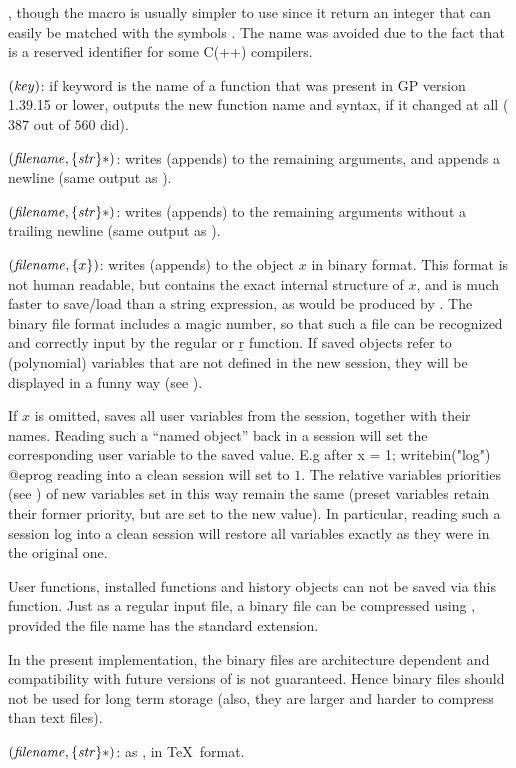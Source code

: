 , though the macro  is usually simpler to use
since it return an integer that can easily be matched with the symbols \typ{*}.
The name  was avoided due to the fact that  is a reserved identifier for some C(++) compilers.

$(\hbox{\it key\/})$: if keyword  is the name
of a function that was present in GP version 1.39.15 or lower, outputs
the new function name and syntax, if it changed at all ($387$ out of $560$
did).\label{se:whatnow}

$(\hbox{\it filename\/},\{\hbox{\it str\/}\}*)$: writes (appends)
to  the remaining arguments, and appends a newline (same output
as ).\label{se:write}

$(\hbox{\it filename\/},\{\hbox{\it str\/}\}*)$: writes (appends) to
 the remaining arguments without a trailing newline
(same output as ).

$(\hbox{\it filename\/},\{x\})$: writes (appends) to
 the object $x$ in binary format. This format is not human
readable, but contains the exact internal structure of $x$, and is much
faster to save/load than a string expression, as would be produced by
. The binary file format includes a magic number, so that such a
file can be recognized and correctly input by the regular  or \b{r}
function. If saved objects refer to (polynomial) variables that are not
defined in the new session, they will be displayed in a funny way (see
).

If $x$ is omitted, saves all user variables from the session, together with
their names. Reading such a ``named object'' back in a  session will set
the corresponding user variable to the saved value. E.g after
\bprog
x = 1; writebin("log")
@eprog\noindent
reading  into a clean session will set  to $1$.
The relative variables priorities (see ) of new variables
set in this way remain the same (preset variables retain their former
priority, but are set to the new value). In particular, reading such a
session log into a clean session will restore all variables exactly as they
were in the original one.

User functions, installed functions and history objects can not be saved via
this function. Just as a regular input file, a binary file can be compressed
using , provided the file name has the standard 
extension. \label{se:writebin}

In the present implementation, the binary files are architecture dependent
and compatibility with future versions of  is not guaranteed. Hence
binary files should not be used for long term storage (also, they are
larger and harder to compress than text files).

$(\hbox{\it filename\/},\{\hbox{\it str\/}\}*)$: as ,
in \TeX\ format.\label{se:writetex}

\vfill\eject
